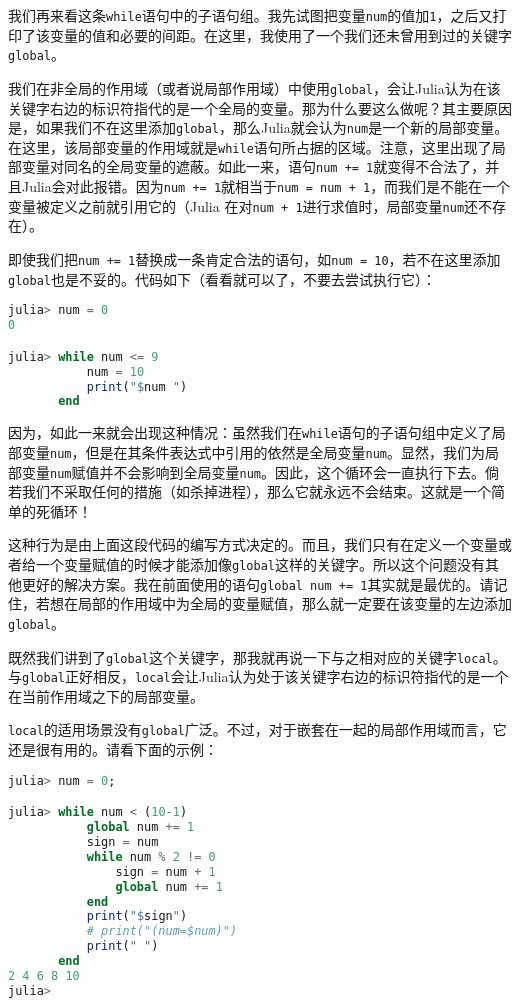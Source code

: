 我们再来看这条\verb`while`语句中的子语句组。我先试图把变量\verb`num`的值加\verb`1`，之后又打印了该变量的值和必要的间距。在这里，我使用了一个我们还未曾用到过的关键字\verb`global`。

我们在非全局的作用域（或者说局部作用域）中使用\verb`global`，会让Julia认为在该关键字右边的标识符指代的是一个全局的变量。那为什么要这么做呢？其主要原因是，如果我们不在这里添加\verb`global`，那么Julia就会认为\verb`num`是一个新的局部变量。在这里，该局部变量的作用域就是\verb`while`语句所占据的区域。注意，这里出现了局部变量对同名的全局变量的遮蔽。如此一来，语句\verb`num += 1`就变得不合法了，并且Julia会对此报错。因为\verb`num += 1`就相当于\verb`num = num + 1`，而我们是不能在一个变量被定义之前就引用它的（Julia 在对\verb`num + 1`进行求值时，局部变量\verb`num`还不存在）。

即使我们把\verb`num += 1`替换成一条肯定合法的语句，如\verb`num = 10`，若不在这里添加\verb`global`也是不妥的。代码如下（看看就可以了，不要去尝试执行它）：

\begin{lstlisting}[language=julia]
julia> num = 0
0

julia> while num <= 9 
           num = 10 
           print("$num ") 
       end
\end{lstlisting}

因为，如此一来就会出现这种情况：虽然我们在\verb`while`语句的子语句组中定义了局部变量\verb`num`，但是在其条件表达式中引用的依然是全局变量\verb`num`。显然，我们为局部变量\verb`num`赋值并不会影响到全局变量\verb`num`。因此，这个循环会一直执行下去。倘若我们不采取任何的措施（如杀掉进程），那么它就永远不会结束。这就是一个简单的死循环！

这种行为是由上面这段代码的编写方式决定的。而且，我们只有在定义一个变量或者给一个变量赋值的时候才能添加像\verb`global`这样的关键字。所以这个问题没有其他更好的解决方案。我在前面使用的语句\verb`global num += 1`其实就是最优的。请记住，若想在局部的作用域中为全局的变量赋值，那么就一定要在该变量的左边添加\verb`global`。

既然我们讲到了\verb`global`这个关键字，那我就再说一下与之相对应的关键字\verb`local`。与\verb`global`正好相反，\verb`local`会让Julia认为处于该关键字右边的标识符指代的是一个在当前作用域之下的局部变量。

\verb`local`的适用场景没有\verb`global`广泛。不过，对于嵌套在一起的局部作用域而言，它还是很有用的。请看下面的示例：

\begin{lstlisting}[language=julia]
julia> num = 0;

julia> while num < (10-1) 
           global num += 1
           sign = num
           while num % 2 != 0
               sign = num + 1
               global num += 1
           end
           print("$sign")
           # print("(num=$num)")
           print(" ")
       end
2 4 6 8 10 
julia> 
\end{lstlisting}

